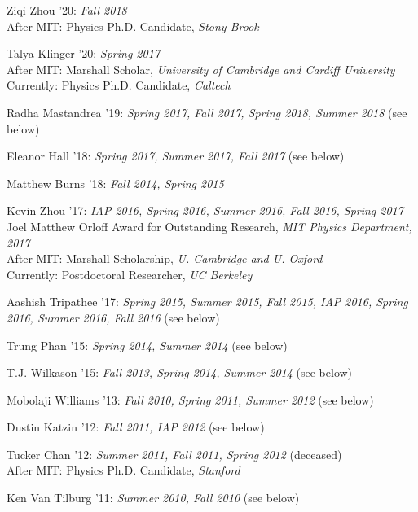 \item Ziqi Zhou '20: \emph{Fall 2018}
\\ After MIT: Physics Ph.D. Candidate, \emph{Stony Brook}

\item Talya Klinger '20: \emph{Spring 2017}
\\ After MIT: Marshall Scholar, \emph{University of Cambridge and Cardiff University}
\\ Currently: Physics Ph.D. Candidate, \emph{Caltech}

\item Radha Mastandrea '19: \emph{Spring 2017, Fall 2017, Spring 2018, Summer 2018} (see below) 

\item Eleanor Hall '18: \emph{Spring 2017, Summer 2017, Fall 2017} (see below) 

\item Matthew Burns '18: \emph{Fall 2014, Spring 2015}

\item Kevin Zhou '17: \emph{IAP 2016, Spring 2016, Summer 2016, Fall 2016, Spring 2017}
\\ Joel Matthew Orloff Award for Outstanding Research, \emph{MIT Physics Department, 2017}
\\ After MIT: Marshall Scholarship, \emph{U. Cambridge and U. Oxford}
\\ Currently: Postdoctoral Researcher, \emph{UC Berkeley}

\item Aashish Tripathee '17: \emph{Spring 2015, Summer 2015, Fall 2015, IAP 2016, Spring 2016, Summer 2016, Fall 2016} (see below) 

\item Trung Phan '15: \emph{Spring 2014, Summer 2014} (see below) 

\item T.J. Wilkason '15: \emph{Fall 2013, Spring 2014, Summer 2014} (see below) 

\item Mobolaji Williams '13: \emph{Fall 2010, Spring 2011, Summer 2012} (see below) 

\item Dustin Katzin '12: \emph{Fall 2011, IAP 2012} (see below) 

\item Tucker Chan '12: \emph{Summer 2011, Fall 2011, Spring 2012} (deceased) 
\\ After MIT: Physics Ph.D. Candidate, \emph{Stanford}

\item Ken Van Tilburg '11: \emph{Summer 2010, Fall 2010} (see below) 

\el
